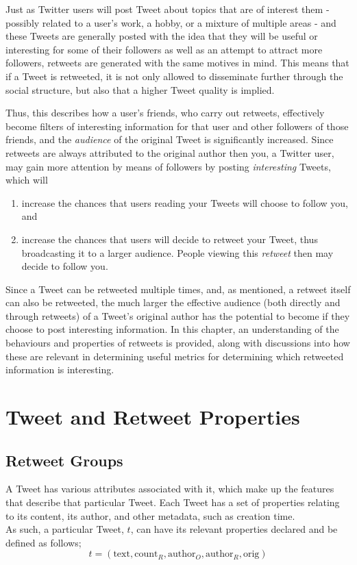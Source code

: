 Just as Twitter users will post Tweet about topics that are of interest them - possibly related to a user's work, a hobby, or a mixture of multiple areas - and these Tweets are generally posted with the idea that they will be useful or interesting for some of their followers as well as an attempt to attract more followers, retweets are generated with the same motives in mind. This means that if a Tweet is retweeted, it is not only allowed to disseminate further through the social structure, but also that a higher Tweet quality is implied.

Thus, this describes how a user's friends, who carry out retweets, effectively become filters of interesting information for that user and other followers of those friends, and the \textit{audience} of the original Tweet is significantly increased. Since retweets are always attributed to the original author then you, a Twitter user, may gain more attention by means of followers by posting \textit{interesting} Tweets, which will 
\begin{enumerate}
\item increase the chances that users reading your Tweets will choose to follow you, and
\item increase the chances that users will decide to retweet your Tweet, thus broadcasting it to a larger audience. People viewing this \textit{retweet} then may decide to follow you. 
\end{enumerate}

Since a Tweet can be retweeted multiple times, and, as mentioned, a retweet itself can also be retweeted, the much larger the effective audience (both directly and through retweets) of a Tweet's original author has the potential to become if they choose to post interesting information. In this chapter, an understanding of the behaviours and properties of retweets is provided, along with discussions into how these are relevant in determining useful metrics for determining which retweeted information is interesting.


\section{Tweet and Retweet Properties}

\subsection{Retweet Groups}
A Tweet has various attributes associated with it, which make up the features that describe that particular Tweet. Each Tweet has a set of properties relating to its content, its author, and other metadata, such as creation time.\\
As such, a particular Tweet, $t$, can have its relevant properties declared and be defined as follows;
\[
	t = (\mathrm{text}, \mathrm{count}_R, \mathrm{author}_O, \mathrm{author}_R, \mathrm{orig})
\]

